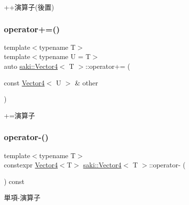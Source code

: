 ++演算子(後置) 

\mbox{\label{classsaki_1_1_vector4_a9488b2bfeac282b94a4bd2ae73acbe1c}} 
\subsubsection{\texorpdfstring{operator+=()}{operator+=()}}
{\footnotesize\ttfamily template$<$typename T$>$ \\
template$<$typename U  = T$>$ \\
auto \mbox{\hyperlink{classsaki_1_1_vector4}{saki\+::\+Vector4}}$<$ T $>$\+::operator+= (\begin{DoxyParamCaption}\item[{const \mbox{\hyperlink{classsaki_1_1_vector4}{Vector4}}$<$ U $>$ \&}]{other }\end{DoxyParamCaption})\hspace{0.3cm}{\ttfamily [inline]}}



+=演算子 

\mbox{\label{classsaki_1_1_vector4_ad5f77cac422a8ba5881af8b7d3465c67}} 
\subsubsection{\texorpdfstring{operator-\/()}{operator-()}}
{\footnotesize\ttfamily template$<$typename T$>$ \\
constexpr \mbox{\hyperlink{classsaki_1_1_vector4}{Vector4}}$<$T$>$ \mbox{\hyperlink{classsaki_1_1_vector4}{saki\+::\+Vector4}}$<$ T $>$\+::operator-\/ (\begin{DoxyParamCaption}{ }\end{DoxyParamCaption}) const\hspace{0.3cm}{\ttfamily [inline]}}



単項-\/演算子 

\mbox{\label{classsaki_1_1_vector4_a26f03e4315ec445ace85fe889029f3eb}} 
